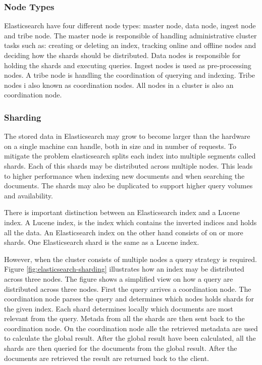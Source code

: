 \subsubsection{Node Types}
Elasticsearch have four different node types: master node, data node, ingest node and tribe node.
The master node is responsible of handling administrative cluster tasks such as:
creating or deleting an index, tracking online and offline nodes and deciding how the shards should be distributed.
Data nodes is responsible for holding the shards and executing queries.
Ingest nodes is used as pre-processing nodes.
A tribe node is handling the coordination of querying and indexing.
Tribe nodes i also known as coordination nodes.
All nodes in a cluster is also an coordination node.

\subsubsection{Sharding}
The stored data in Elasticsearch may grow to become larger than the hardware on a single machine can handle,
both in size and in number of requests.
To mitigate the problem elasticsearch splits each index into multiple segments called shards.
Each of this shards may be distributed across multiple nodes.
This leads to higher performance when indexing new documents and when searching the documents.
The shards may also be duplicated to support higher query volumes and availability.

There is important distinction between an Elasticsearch index and a Lucene index.
A Lucene index, is the index which contains the inverted indices and holds all the data.
An Elasticsearch index on the other hand consists of on or more shards.
One Elasticsearch shard is the same as a Lucene index.

However, when the cluster consists of multiple nodes a query strategy is required.
Figure \ref{fig:elasticsearch-sharding} illustrates how an index may be distributed across three nodes.
The figure shows a simplified view on how a query are distributed across three nodes.
First the query arrives a coordination node.
The coordination node parses the query and determines which nodes holds shards for the given index.
Each shard determines locally which documents are most relevant from the query.
Metada from all the shards are then sent back to the coordination node.
On the coordination node alle the retrieved metadata are used to calculate the global result.
After the global result have been calculated,
all the shards are then queried for the documents from the global result.
After the documents are retrieved the result are returned back to the client.

